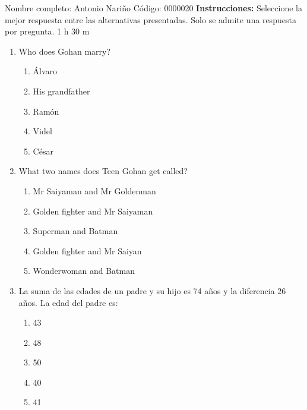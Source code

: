 \documentclass[letterpaper,addpoints,answers,twocolumn,10pt]{exam}
\begin{document}
\noindent Nombre completo: Antonio Nariño
\newline \newline \newline \newline
Código: 0000020\newline \newline 
{\bf Instrucciones:} Seleccione la mejor respuesta entre las alternativas presentadas. Solo se admite una respuesta por pregunta.
 1 h 30 m

\begin{enumerate}[leftmargin=.2in]




\item  Who does Gohan marry?


\begin{enumerate}[noitemsep,leftmargin=0in]


\item  Álvaro
\item  His grandfather
\item  Ramón
\item  Videl
\item  César


\end{enumerate}



\item  What two names does Teen Gohan get called?


\begin{enumerate}[noitemsep,leftmargin=0in]


\item  Mr Saiyaman and Mr Goldenman
\item  Golden fighter and Mr Saiyaman
\item  Superman and Batman
\item  Golden fighter and Mr Saiyan
\item  Wonderwoman and Batman


\end{enumerate}



\item  La suma de las edades de un padre y su hijo es 74 años y la diferencia 26 años. La edad del padre es:


\begin{enumerate}[noitemsep,leftmargin=0in]


\item  43
\item  48
\item  50
\item  40
\item  41



\end{enumerate}
\end{enumerate}
\end{document}

